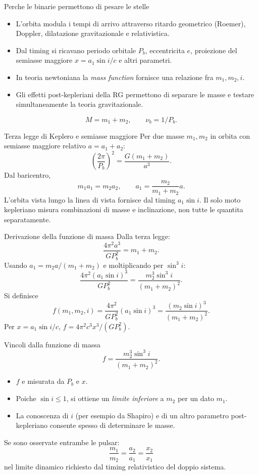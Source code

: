 \begin{frame}[t]{Perche le binarie permettono di pesare le stelle}
\small
\begin{itemize}
\item L'orbita modula i tempi di arrivo attraverso ritardo geometrico (Roemer), Doppler, dilatazione gravitazionale e relativistica.
\item Dal timing si ricavano periodo orbitale $P_b$, eccentricita $e$, proiezione del semiasse maggiore $x=a_1\sin i/c$ e altri parametri.
\item In teoria newtoniana la \emph{mass function} fornisce una relazione fra $m_1,m_2,i$.
\item Gli effetti post-kepleriani della RG permettono di separare le masse e testare simultaneamente la teoria gravitazionale.
\end{itemize}
\[
M=m_1+m_2,\qquad \nu_b=1/P_b.
\]
\end{frame}

\begin{frame}[t]{Terza legge di Keplero e semiasse maggiore}
\small
Per due masse $m_1,m_2$ in orbita con semiasse maggiore relativo $a=a_1+a_2$:
\[
\left(\frac{2\pi}{P_b}\right)^2
=\frac{G(m_1+m_2)}{a^3}.
\]
Dal baricentro,
\[
m_1a_1=m_2a_2,
\qquad a_1=\frac{m_2}{m_1+m_2}a.
\]
L'orbita vista lungo la linea di vista fornisce dal timing $a_1\sin i$.
\medskip
Il solo moto kepleriano misura combinazioni di masse e inclinazione, non tutte le quantita separatamente.
\end{frame}

\begin{frame}[t]{Derivazione della funzione di massa}
\small
Dalla terza legge:
\[
\frac{4\pi^2a^3}{GP_b^2}=m_1+m_2.
\]
Usando $a_1=m_2a/(m_1+m_2)$ e moltiplicando per $\sin^3 i$:
\[
\frac{4\pi^2(a_1\sin i)^3}{GP_b^2}
=\frac{m_2^3\sin^3 i}{(m_1+m_2)^2}.
\]
Si definisce
\[
f(m_1,m_2,i)=\frac{4\pi^2}{GP_b^2}(a_1\sin i)^3
=\frac{(m_2\sin i)^3}{(m_1+m_2)^2}.
\]
Per $x=a_1\sin i/c$, $f=4\pi^2c^3x^3/(GP_b^2)$.
\end{frame}

\begin{frame}[t]{Vincoli dalla funzione di massa}
\small
\[
f=\frac{m_2^3\sin^3i}{(m_1+m_2)^2}.
\]
\begin{itemize}
\item $f$ e misurata da $P_b$ e $x$.
\item Poiche $\sin i\leq1$, si ottiene un \emph{limite inferiore} a $m_2$ per un dato $m_1$.
\item La conoscenza di $i$ (per esempio da Shapiro) e di un altro parametro post-kepleriano consente spesso di determinare le masse.
\end{itemize}
Se sono osservate entrambe le pulsar:
\[
\frac{m_1}{m_2}=\frac{a_2}{a_1}=\frac{x_2}{x_1}
\]
nel limite dinamico richiesto dal timing relativistico del doppio sistema.
\end{frame}

